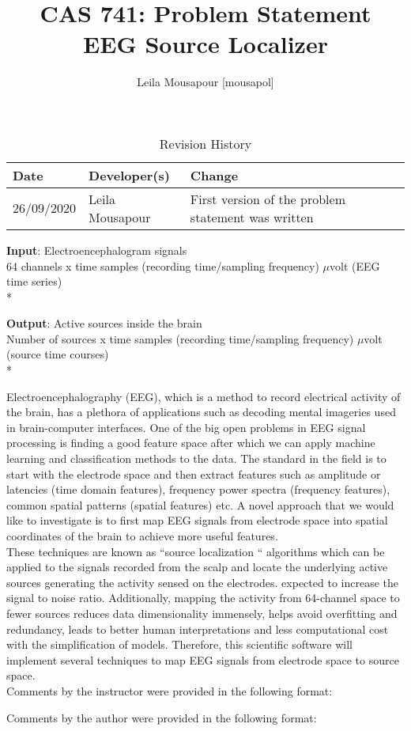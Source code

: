 \documentclass{article}
\title{CAS 741: Problem Statement\\EEG Source Localizer}
\author{Leila Mousapour [mousapol]}
\date{}
\begin{document}
\maketitle

\begin{table}[hp]
\caption{Revision History} \label{TblRevisionHistory}
\begin{tabularx}{\textwidth}{llX}
\toprule
\textbf{Date} & \textbf{Developer(s)} & \textbf{Change}\\
\midrule
26/09/2020 & Leila Mousapour & First version of the problem statement was written\\
\bottomrule
\end{tabularx}
\end{table}

\textbf{Input}: Electroencephalogram signals
\\
{\footnotesize 64 channels x time samples (recording time/sampling frequency) $\mu$volt (EEG time series)}
\\*

\textbf{Output}: Active sources inside the brain
\\
{\footnotesize Number of sources x time samples (recording time/sampling frequency)  $\mu$volt (source time courses)}
\\*

Electroencephalography (EEG), which is a method to record electrical activity of the brain, has a plethora of applications such as decoding mental imageries used in brain-computer interfaces. One of the big open problems in EEG signal processing is finding a good feature space after which we can apply machine learning and classification methods to the data. The standard in the field is to start with the electrode space and then extract features such as amplitude or latencies (time domain features), frequency power spectra (frequency features), common spatial patterns (spatial features) etc. A novel approach that we would like to investigate is to first map EEG signals from electrode space into spatial coordinates of the brain to achieve more useful features.
\\

These techniques are known as  ``source localization `` algorithms which can be applied to the signals recorded from the scalp and locate the underlying active sources generating the activity sensed on the electrodes. expected to increase the signal to noise ratio. Additionally, mapping the activity from 64-channel space to fewer sources reduces data dimensionality immensely, helps avoid overfitting and redundancy, leads to better human interpretations and less computational cost with the simplification of models. Therefore, this scientific software will implement several techniques to map EEG signals from electrode space to source space.
\\

Comments by the instructor were provided in the following format:


Comments by the author were provided in the following format:

\end{document}
